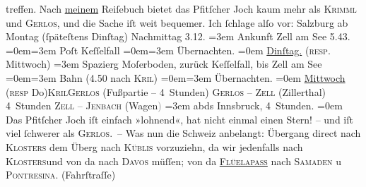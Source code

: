 {\begin{ledgroupsized}[t]{13cm}
               treffen.\pend
           \pstart
           Nach \uline{meinem} Reiſebuch bietet das Pfitſcher Joch kaum mehr als \textsc{Krimml} und \textsc{Gerlos}, und die Sache iſt weit bequemer.\pend
           \pstart
           Ich ſchlage alſo vor:\pend
           \pstart
           Salzburg ab Montag (ſpäteſtens
                  Dinſtag) Nachmittag 3.12.\pend
           \leftskip=3em{}\pstart
           \noindent{}{\pb}Ankunft Zell am See{ }5.43.\pend
           \leftskip=0em{}\leftskip=3em{}\pstart
           Poſt Keſſelfall\pend
           \leftskip=0em{}\leftskip=3em{}\pstart
           Übernachten.\pend
           \leftskip=0em{}\pstart
           \noindent{}\uline{Dinſtag.} (\textsc{resp}. Mittwoch)\pend
           \leftskip=3em{}\pstart
           \noindent{}Spazierg Moſerboden, zurück Keſſelfall, bis Zell
                  am See\pend
           \leftskip=0em{}\leftskip=3em{}\pstart
           Bahn (4.50 nach \textsc{Kri{\geminationm}l})\pend
           \leftskip=0em{}\leftskip=3em{}\pstart
           Übernachten.\pend
           \leftskip=0em{}\pstart
           \noindent{}\uline{Mittwoch}{ }\introOben{}(\textsc{resp}{ }Do{\geminationn})\introOben{}{ }\textsc{Kri{\geminationm}l}\textsc{Gerlos} (Fußpartie – 4 Stunden)\pend
           \pstart
           \textsc{Gerlos} – \textsc{Zell} (Zillerthal) 4 Stunden\pend
           \pstart
           \textsc{Zell – Jenbach} (Wagen\textcolor{gray}{)}\pend
           \leftskip=3em{}\pstart
           \noindent{}abds{ }Innsbruck, 4 Stunden.\pend
           \leftskip=0em{}\pstart
           \noindent{}{\pb}Das Pfitſcher
                  Joch iſt einfach »lohnend«, hat nicht einmal einen Stern! – und iſt
               viel ſchwerer als \textsc{Gerlos}. –\pend
           \pstart
           Was nun die Schweiz anbelangt: Übergang direct
               nach \textsc{Klosters} dem Überg nach \textsc{Küblis} vorzuziehn, da wir jedenfalls nach \textsc{Klosters}und von da nach \textsc{Davos} müſſen; von da \textsc{\uline{Flüelapass}} nach \textsc{Samaden} u \textsc{Pontresina}. (Fahrſtraſſe)\pend

\end{ledgroupsized}}
